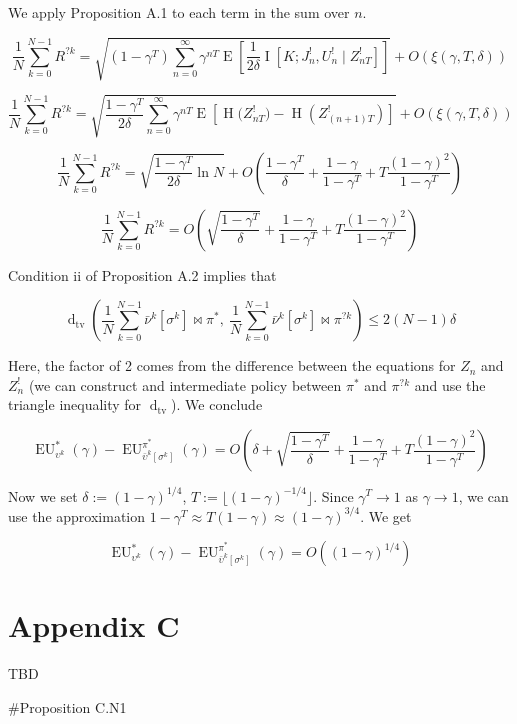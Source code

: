 \documentclass[a4paper]{article}
\newcommand{\E}[1]{\underset{#1}{\operatorname{E}}}
\newcommand{\I}[1]{\underset{#1}{\operatorname{I}}}
\newcommand{\En}{\operatorname{H}}
\newcommand{\Dtv}{\operatorname{d}_{\text{tv}}}
\newcommand{\Floor}[1]{\lfloor #1 \rfloor}
\newcommand{\EU}{\operatorname{EU}}
\newcommand{\J}{J}
\begin{document}
We apply Proposition A.1 to each term in the sum over $n$.

$$\frac{1}{N}\sum_{k=0}^{N-1}R^{?k} = \sqrt{(1-\gamma^T)\sum_{n=0}^\infty \gamma^{nT} \E{}\left[\frac{1}{2\delta}\I{}\left[K;\J^!_n,U^!_n \mid Z^!_{nT}\right]\right]} + O\left(\xi(\gamma,T,\delta)\right)$$

$$\frac{1}{N}\sum_{k=0}^{N-1}R^{?k} = \sqrt{\frac{1-\gamma^T}{2\delta}\sum_{n=0}^\infty \gamma^{nT} \E{}\left[\En\Big(Z^!_{nT}\Big)-\En\left(Z^!_{(n+1)T}\right)\right]} + O\left(\xi(\gamma,T,\delta)\right)$$

$$\frac{1}{N}\sum_{k=0}^{N-1}R^{?k} = \sqrt{\frac{1-\gamma^T}{2\delta}\ln N} + O\left(\frac{1-\gamma^T}{\delta}+\frac{1-\gamma}{1-\gamma^T}+T\frac{(1-\gamma)^2}{1-\gamma^T}\right)$$

$$\frac{1}{N}\sum_{k=0}^{N-1}R^{?k} = O\left(\sqrt{\frac{1-\gamma^T}{\delta}} +\frac{1-\gamma}{1-\gamma^T}+T\frac{(1-\gamma)^2}{1-\gamma^T}\right)$$

Condition ii of Proposition A.2 implies that

$$\Dtv\left(\frac{1}{N}\sum_{k=0}^{N-1}{\bar{\nu}^k\left[\sigma^k\right]\bowtie\pi^*},\ \frac{1}{N}\sum_{k=0}^{N-1}{\bar{\nu}^k\left[\sigma^k\right]\bowtie\pi^{?k}}\right) \leq 2(N-1)\delta$$

Here, the factor of 2 comes from the difference between the equations for $Z_n$ and $Z^!_n$ (we can construct and intermediate policy between $\pi^*$ and $\pi^{?k}$ and use the triangle inequality for $\Dtv$). We conclude

$$\EU^*_{\upsilon^k}(\gamma)-\EU^{\pi^{*}}_{\bar{\upsilon}^k[\sigma^k]}(\gamma) = O\left(\delta+\sqrt{\frac{1-\gamma^T}{\delta}} +\frac{1-\gamma}{1-\gamma^T}+T\frac{(1-\gamma)^2}{1-\gamma^T}\right)$$

Now we set $\delta:=\left(1-\gamma\right)^{1/4}$,  $T:=\Floor{\left(1-\gamma\right)^{-1/4}}$. Since $\gamma^T \rightarrow 1$ as $\gamma \rightarrow 1$, we can use the approximation $1-\gamma^T \approx T(1-\gamma) \approx (1-\gamma)^{3/4}$. We get

$$\EU^*_{\upsilon^k}(\gamma)-\EU^{\pi^{*}}_{\bar{\upsilon}^k[\sigma^k]}(\gamma) = O\left((1-\gamma)^{1/4}\right)$$

\section{Appendix C}

TBD

\#Proposition C.N1
\end{document}
